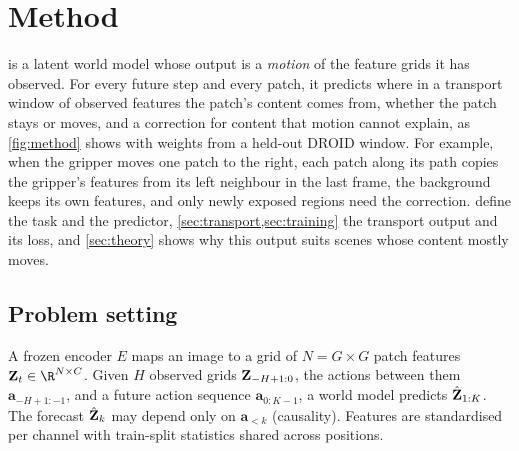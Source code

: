 \section{Method}
\label{sec:method}

\ours{} is a latent world model whose output is a \emph{motion} of the feature grids it has
observed.
%
For every future step and every patch, it predicts where in a transport window of observed features the patch's content
comes from, whether the patch stays or moves, and a correction for content that motion cannot explain, as
\cref{fig:method} shows with weights from a held-out DROID window.
%
For example, when the gripper moves one patch to the right, each patch along its path copies the gripper's features
from its left neighbour in the last frame, the background keeps its own features, and only newly exposed regions need
the correction.
%
 define the task and the predictor, \cref{sec:transport,sec:training} the transport output
and its loss, and \cref{sec:theory} shows why this output suits scenes whose content mostly moves.


\subsection{Problem setting}
\label{sec:setting}
A frozen encoder $E$ maps an image to a grid of $N=G\times G$ patch features $\Z_t\in\R^{N\times C}$. Given $H$
observed grids $\mathbf{Z}_{-H+1:0}$, the actions between them $\mathbf{a}_{-H+1:-1}$, and a future action sequence
$\mathbf{a}_{0:K-1}$, a world model predicts $\hat{\mathbf{Z}}_{1:K}$. The forecast $\hat{\mathbf{Z}}_k$ may depend only on
$\mathbf{a}_{<k}$ (causality).
%
Features are standardised per channel with train-split statistics shared across positions.


